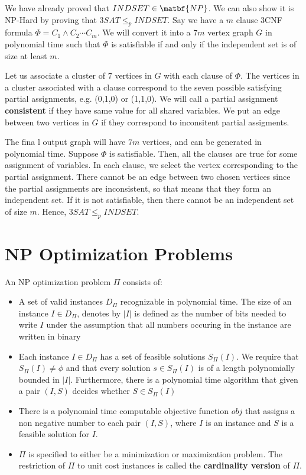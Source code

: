 \documentclass[12pt,letterpaper]{article}
\theoremstyle{definition}
\begin{document}
We have already proved that $INDSET \in \matbf{NP}$. We can also show it is NP-Hard by proving that $3SAT \leq_p INDSET$. Say we have a $m$ clause 3CNF formula $\Phi = C_1 \land C_2 \cdots C_m$. We will convert it into a $7m$ vertex graph $G$ in polynomial time such that $\Phi$ is satisfiable if and only if the independent set is of size at least $m$.

Let us associate a cluster of 7 vertices in $G$ with each clause of $\Phi$. The vertices in a cluster associated with a clause correspond to the seven possible satisfying partial assignments, e.g. (0,1,0) or (1,1,0). We will call a partial assignment \textbf{consistent} if they have same value for all shared variables.  We put an edge between two vertices in $G$ if they correspond to inconsitent partial assigments. 

The fina l output graph will have $7m$ vertices, and can be generated in polynomial time. Suppose $\Phi$ is satisfiable. Then, all the clauses are true for some assignment of variables. In each clause, we select the vertex corresponding to the partial assignment. There cannot be an edge between two chosen vertices since the partial assignments are inconsistent, so that means that they form an independent set. If it is not satisfiable, then there cannot be an independent set of size $m$. Hence, $3SAT \leq_p INDSET$.

\section{NP Optimization Problems}

An NP optimization problem $\Pi$ consists of:

\begin{itemize}
  \item A set of valid instances $D_\Pi$ recognizable in polynomial time. The size of an instance $I \in D_\Pi$, denotes by $|I|$ is defined as the number of bits needed to write $I$ under the assumption that all numbers occuring in the instance are written in binary
  \item Each instance $I \in D_\Pi$ has a set of feasible solutions $S_\Pi (I)$. We require that $S_\Pi(I) \neq \phi$  and that every solution $s \in S_\Pi(I)$ is of a length polynomially bounded in $|I|$.  Furthermore, there is a polynomial time algorithm that given a pair $(I,S)$ decides whether $S \in S_\Pi(I)$
  \item There is a polynomial time computable objective function $obj$ that assigns a non negative number to each pair $(I,S)$, where $I$ is an instance and $S$ is a feasible solution for $I$.
  \item $\Pi$ is specified to either be a minimization or maximization problem. The restriction of $\Pi$ to unit cost instances is called the \textbf{cardinality version} of $\Pi$.
\end{itemize}
\end{document}
